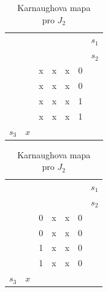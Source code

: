 \newpage 
\begin{table}[!h]
\begin{minipage}{.5\linewidth}
      \caption{Karnaughova mapa\\ pro $K_1$}
      \centering
    \begin{tabular}{lllllll}
      			       &       					 &       				 &  &	\colorbox{yellow}{}& \colorbox{yellow}{}        &$s_1$ \\
    		 	       &        					&       & \colorbox{red}{}    & 	\colorbox{red}{} 			      &         &$s_2$     \\
    		 	       &        					& x   				 & x    				   & x     				& 0       &  \\
              	       & \colorbox{black}{}       & x     				 & x    				   & x   		  			& 0       &  \\
\colorbox{blue}{}& \colorbox{black}{}       & x    				 & x     				   & x     				& 1       &  \\
\colorbox{blue}{}&       					 & x   				 & x				  	   & x    					& 1       &  \\
    	  $ s_3$ 	& $x$  					&     				 &       				   &       				  	 &          &  \\
    \end{tabular}%
  \end{minipage}%
    \begin{minipage}{.5\linewidth}
      \centering
        \caption{Karnaughova mapa\\ pro $J_2$}
    \begin{tabular}{lllllll}
      			       &       					 &       				 &  &	\colorbox{yellow}{}&\colorbox{yellow}{}         &$s_1$ \\
    		 	       &        					&      & \colorbox{red}{}    & 	\colorbox{red}{}  			      &         &$s_2$     \\
    		 	       &        					& 0    				 & x    				   & x     				& 0       &  \\
              	       & \colorbox{black}{}       & 0     				 & x    				   & x   		  			& 0       &  \\
\colorbox{blue}{}& \colorbox{black}{}       & 1    				 & x     				   & x     				& 0       &  \\
\colorbox{blue}{}&       					 & 1   				 & x				  	   & x    					& 0       &  \\
    	  $ s_3$ 	& $x$  					&     				 &       				   &       				  	 &          &  \\
    \end{tabular}%
  \end{minipage} 

   
  \label{tab:addlabel}%
\end{table}%

